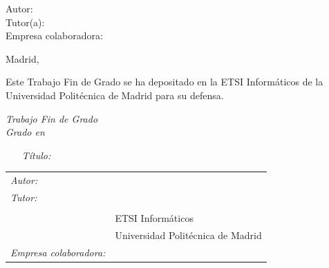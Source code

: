 \begin{titlepage}
\vspace*{0.5cm}
\begin{center}
\huge\bfseries {  \TituloTFG{} } 
\end{center}

\vspace*{5cm}

\noindent
\large{Autor: \NombreAutor{} }\\
\large{Tutor(a): \NombreTutor{} }\\
\large{Empresa colaboradora: \EmpresaColaboradora{} }


\vspace*{4cm}
\begin{center}
Madrid, \Fecha
\end{center}

\newpage
\thispagestyle{empty}
\noindent
Este Trabajo Fin de Grado se ha depositado en la ETSI Informáticos de la Universidad Politécnica de Madrid para su defensa.

\vspace*{4cm}
\noindent
\textit{Trabajo Fin de Grado}\\
\textit{Grado en} \Grado{}

\begin{enumerate}
\item[\textit{Título:}] \TituloTFG{}
\end{enumerate}
\Fecha


\vspace*{3cm}

\noindent
\begin{tabular}{ll}
\textit{Autor:} & \NombreAutor{}  \\ 
\textit{Tutor:} & \NombreTutor{}  \\ 
                & \Departamento{} \\
                & ETSI Informáticos\\
                & Universidad Politécnica de Madrid \\
\textit{Empresa colaboradora:} & \EmpresaColaboradora{}  \\
\end{tabular} 

\end{titlepage}
